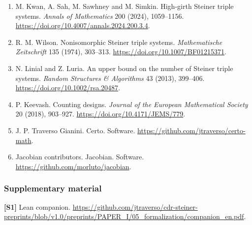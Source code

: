 \documentclass[english,11pt,a4paper]{article}
\begin{document}
\begin{enumerate}
\item
  M. Kwan, A. Sah, M. Sawhney and M. Simkin. High-girth Steiner triple systems. \emph{Annals of Mathematics} 200 (2024), 1059--1156. \url{https://doi.org/10.4007/annals.2024.200.3.4}.
\item
  R. M. Wilson. Nonisomorphic Steiner triple systems. \emph{Mathematische Zeitschrift} 135 (1974), 303--313. \url{https://doi.org/10.1007/BF01215371}.
\item
  N. Linial and Z. Luria. An upper bound on the number of Steiner triple systems. \emph{Random Structures \& Algorithms} 43 (2013), 399--406. \url{https://doi.org/10.1002/rsa.20487}.
\item
  P. Keevash. Counting designs. \emph{Journal of the European Mathematical Society} 20 (2018), 903--927. \url{https://doi.org/10.4171/JEMS/779}.
\item
  J. P. Traverso Gianini. Certo. Software. \url{https://github.com/jtraverso/certo-math}.
\item
  Jacobian contributors. Jacobian. Software. \url{https://github.com/morluto/jacobian}.
\end{enumerate}

\subsubsection{Supplementary material}\label{supplementary-material}

\textbf{{[}S1{]}} Lean companion. \url{https://github.com/jtraverso/cdr-steiner-preprints/blob/v1.0/preprints/PAPER_I/05_formalization/companion_en.pdf}.
\end{document}
